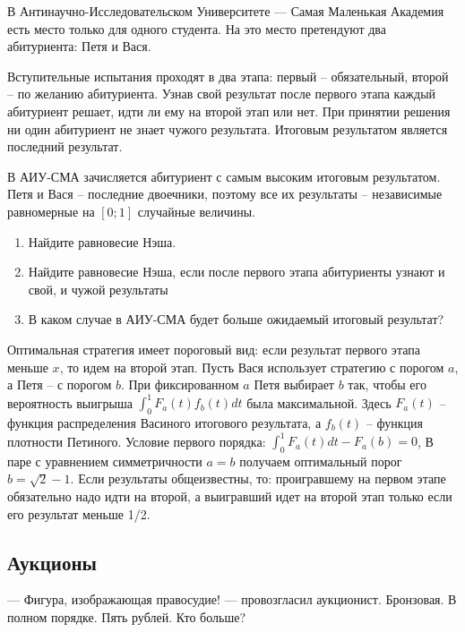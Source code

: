 \begin{problem}
В Антинаучно-Исследовательском Университете --- Самая Маленькая Академия есть место только для одного студента. На это место претендуют два абитуриента: Петя и Вася.

Вступительные испытания проходят в два этапа: первый -- обязательный, второй -- по желанию абитуриента. Узнав свой результат после первого этапа каждый абитуриент решает, идти ли ему на второй этап или нет. При принятии решения ни один абитуриент не знает чужого результата. Итоговым результатом является последний результат.

В АИУ-СМА зачисляется абитуриент с самым высоким итоговым результатом. Петя и Вася -- последние двоечники, поэтому все их результаты -- независимые равномерные на $[0;1]$ случайные величины.

\begin{enumerate}
\item Найдите равновесие Нэша.
\item Найдите равновесие Нэша, если после первого этапа абитуриенты узнают и свой, и чужой результаты
\item В каком случае в АИУ-СМА будет больше ожидаемый итоговый результат?
\end{enumerate}




\begin{sol}
Оптимальная стратегия имеет пороговый вид: если результат первого этапа меньше $x$, то идем на второй этап. Пусть Вася использует стратегию с порогом $a$, а Петя -- с порогом $b$. При фиксированном $a$ Петя выбирает $b$ так, чтобы его вероятность выигрыша $\int_{0}^{1}F_{a}(t)f_{b}(t)dt$ была максимальной. Здесь $F_{a}(t)$ -- функция распределения Васиного итогового результата, а $f_{b}(t)$ -- функция плотности Петиного. Условие первого порядка: $\int_{0}^{1}F_{a}(t)dt-F_{a}(b)=0$,  В паре с уравнением симметричности $a=b$ получаем оптимальный порог $b=\sqrt{2}-1$. Если результаты общеизвестны, то: проигравшему на первом этапе обязательно надо идти на второй, а выигравший идет на второй этап только если его результат меньше 1/2.
\end{sol}
\end{problem}



\subsection{Аукционы}
\begin{rem}
--- Фигура, изображающая правосудие! --- провозгласил аукционист. Бронзовая. В полном порядке. Пять рублей. Кто больше?
\end{rem}


